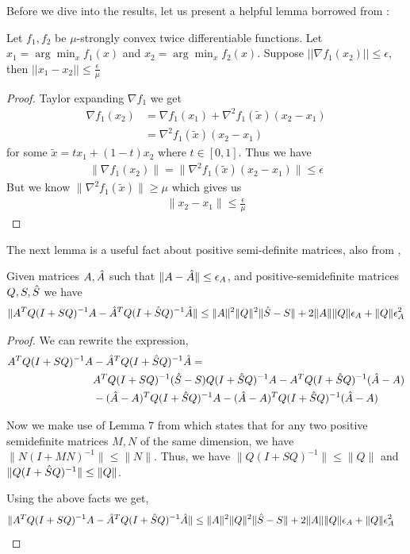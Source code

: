 Before we dive into the results, let us present a helpful lemma
borrowed from \cite{mania19}:
\begin{lemma}
  Let $f_1, f_2$ be $\mu$-strongly convex twice differentiable
  functions. Let $x_1 = \arg\min_x f_1(x)$ and $x_2 = \arg\min_x
  f_2(x)$. Suppose $||\nabla f_1(x_2)|| \leq \epsilon$, then $||x_1 -
  x_2|| \leq \frac{\epsilon}{\mu}$
  \label{lemma:1}
\end{lemma}
\begin{proof}
  Taylor expanding $\nabla f_{1}$ we get
  \begin{align*}
    \nabla f_{1}(x_{2}) &= \nabla f_{1}(x_{1}) + \nabla^{2}f_{1}(\tilde{x})(x_{2} - x_{1}) \\
    &= \nabla^{2}f_{1}(\tilde{x})(x_{2} - x_{1})
  \end{align*}
  for some $\tilde{x} = tx_{1}+ (1-t)x_{2}$ where $t \in [0, 1]$. Thus we have
  \begin{align*}
    \|\nabla f_{1}(x_{2})\| = \|\nabla^{2}f_{1}(\tilde{x})(x_{2} - x_{1})\| \leq \epsilon
  \end{align*}
  But we know $\|\nabla^{2}f_{1}(\tilde{x})\| \geq \mu$ which gives us
  \begin{align*}
    \|x_{2} - x_{1}\| \leq \frac{\epsilon}{\mu}
  \end{align*}
\end{proof}

The next lemma is a useful fact about positive semi-definite matrices,
also from \cite{mania19},
\begin{lemma}
  \label{lemma:mania-appendix-original}
  Given matrices $A, \hat{A}$ such that $\|A - \hat{A}\| \leq \epsilon_A$,
  and positive-semidefinite matrices $Q, S, \hat{S}$ we have
  \begin{equation}
    \label{eq:89}
    \|A^{T}Q(I + SQ)^{-1}A - \hat{A}^{T}Q(I + \hat{S} Q)^{-1}\hat{A}\| \leq \|A\|^{2}\|Q\|^{2}\|\hat{S} - S\| + 2\|A\|\|Q\|\epsilon_A + \|Q\|\epsilon_A^{2}
  \end{equation}
\end{lemma}
\begin{proof}
  We can rewrite the expression,
  \begin{align*}
    A^{T}Q(I + SQ)^{-1}A &- \hat{A}^{T}Q(I + \hat{S} Q)^{-1}\hat{A} = \\
                         &A^{T}Q(I + SQ)^{-1}(\hat{S} - S)Q(I+\hat{S} Q)^{-1}A - A^{T}Q(I + \hat{S} Q)^{-1}(\hat{A} - A) \\
    &-(\hat{A} - A)^{T}Q(I + \hat{S} Q)^{-1}A - (\hat{A} - A)^{T}Q(I + \hat{S} Q)^{-1}(\hat{A} - A)
  \end{align*}

  Now we make use of Lemma 7 from \cite{mania19} which states that for any two
  positive semidefinite matrices $M, N$ of the same dimension, we have
  $\|N(I + MN)^{-1}\| \leq \|N\|$. Thus, we have $\|Q(I+SQ)^{-1}\| \leq \|Q\|$
  and $\|Q(I + \hat{S} Q)^{-1}\| \leq \|Q\|$.

  Using the above facts we get,
  \begin{align*}
    \|A^{T}Q(I + SQ)^{-1}A - \hat{A}^{T}Q(I + \hat{S} Q)^{-1}\hat{A}\| &\leq \|A\|^{2}\|Q\|^{2}\|\hat{S} - S\| + 2\|A\|\|Q\|\epsilon_A + \|Q\|\epsilon_A^{2}
  \end{align*}
\end{proof}

